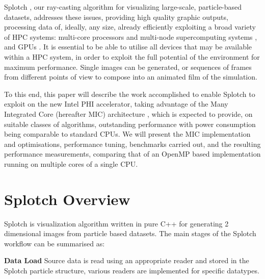 \documentclass[runningheads,a4paper]{llncs}
\begin{document}
Splotch \cite{splotch}, our ray-casting algorithm for visualizing large-scale, particle-based datasets, addresses these issues, 
providing high quality graphic outputs, processing data of, ideally, any size, already efficiently exploiting a broad 
variety of HPC systems: multi-core processors and multi-node supercomputing systems \cite{splotchmulti}, and GPUs \cite{splotchgpu}. 
It is essential to be able to utilise all devices that may be available within a HPC system, in order to exploit the full 
potential of the environment for maximum performance. Single images can be generated, or sequences of frames from 
different points of view to compose into an animated film of the simulation.

To this end, this paper will describe the work accomplished to enable Splotch to exploit on the new Intel PHI \cite{xeonphi} 
accelerator, taking advantage of the Many Integrated Core (hereafter MIC) architecture \cite{mic}, which is expected to provide, 
on suitable classes of algorithms, outstanding performance with power consumption being comparable to standard CPUs. 
We will present the MIC implementation and optimisations, performance tuning, benchmarks carried out, and the resulting 
performance measurements, comparing that of an OpenMP based implementation running on multiple cores of a single CPU. 

\section{Splotch Overview}
\label{sect:overview}


Splotch is visualization algorithm written in pure C++ for generating 2 dimensional images from particle based datasets. 
The main stages of the Splotch workflow can be summarised as:

\vskip 1pc
\noindent
\textbf{Data Load}
  Source data is read using an appropriate reader and stored in the Splotch particle structure, various readers are 
  implemented for specific datatypes.
  
\end{document}
